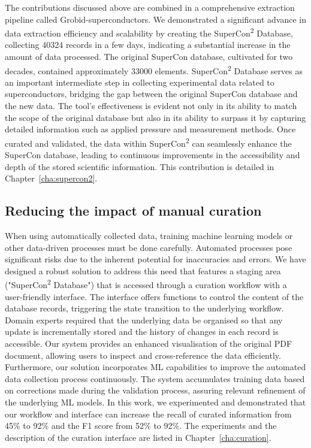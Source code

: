 The contributions discussed above are combined in a comprehensive extraction pipeline called Grobid-superconductors.
We demonstrated a significant advance in data extraction efficiency and scalability by creating the SuperCon\textsuperscript{2} Database, collecting 40324 records in a few days, indicating a substantial increase in the amount of data processed.
The original SuperCon database, cultivated for two decades, contained approximately 33000 elements.
SuperCon\textsuperscript{2} Database serves as an important intermediate step in collecting experimental data related to superconductors, bridging the gap between the original SuperCon database and the new data. 
The tool's effectiveness is evident not only in its ability to match the scope of the original database but also in its ability to surpass it by capturing detailed information such as applied pressure and measurement methods. 
Once curated and validated, the data within SuperCon\textsuperscript{2} can seamlessly enhance the SuperCon database, leading to continuous improvements in the accessibility and depth of the stored scientific information.
This contribution is detailed in Chapter~\ref{cha:supercon2}.

\subsection{Reducing the impact of manual curation}
\label{sec:intro-curation}

When using automatically collected data, training machine learning models or other data-driven processes must be done carefully. 
Automated processes pose significant risks due to the inherent potential for inaccuracies and errors.
We have designed a robust solution to address this need that features a staging area ("SuperCon\textsuperscript{2} Database") that is accessed through a curation workflow with a user-friendly interface. 
The interface offers functions to control the content of the database records, triggering the state transition to the underlying workflow. 
Domain experts required that the underlying data be organised so that any update is incrementally stored and the history of changes in each record is accessible. 
Our system provides an enhanced visualisation of the original PDF document, allowing users to inspect and cross-reference the data efficiently. 
Furthermore, our solution incorporates ML capabilities to improve the automated data collection process continuously. 
The system accumulates training data based on corrections made during the validation process, assuring relevant refinement of the underlying ML models.
In this work, we experimented and demonstrated that our workflow and interface can increase the recall of curated information from 45\% to 92\% and the F1 score from 52\% to 92\%. 
The experiments and the description of the curation interface are listed in Chapter~\ref{cha:curation}.